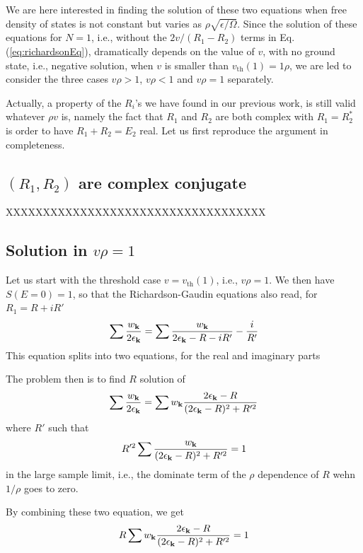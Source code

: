 \documentclass{article}
\begin{document}
We are here interested in finding the solution of these two equations when free density of states is not constant but varies as $\rho\sqrt{\epsilon/\Omega}$.  Since the solution of these equations for $N=1$, i.e., without the $2v/(R_1-R_2)$ terms in Eq. (\ref{eq:richardsonEq}), dramatically depends on the value of $v$, with no ground state, i.e., negative solution, when $v$ is smaller than $v_{\text{th}}(1)=1\rho$, we are led to consider the three cases $v\rho>1$, $v\rho<1$ and $v\rho=1$ separately. 

Actually, a property of the $R_i$'s we have found in our previous work, is still valid whatever $\rho{}v$ is, namely the fact that $R_1$ and $R_2$ are both complex with $R_1=R_2^*$ is order to have $R_1+R_2=E_2$ real.  Let us first reproduce the argument in completeness. 

\subsection{$(R_1,R_2)$ are complex conjugate}
XXXXXXXXXXXXXXXXXXXXXXXXXXXXXXXXXXX
\subsection{Solution in $v\rho=1$}
Let us start with the threshold case $v=v_{\text{th}}(1)$, i.e., $v\rho=1$.  We then have $S(E=0)=1$, so that the Richardson-Gaudin equations also read, for $R_1=R+iR'$
\begin{equation}
\sum\frac{w_{\mathbf{k}}}{2\epsilon_{\mathbf{k}}}=\sum\frac{w_{\mathbf{k}}}{2\epsilon_{\mathbf{k}}-R-iR'}-\frac{i}{R'}
\label{eq:}
\end{equation}
This equation splits into two equations, for the real and imaginary parts

The problem then is to find $R$ solution of 
\begin{equation}
\sum\frac{w_{\mathbf{k}}}{2\epsilon_{\mathbf{k}}}=\sum{}w_{\mathbf{k}}\frac{2\epsilon_{\mathbf{k}}-R}{(2\epsilon_{\mathbf{k}}-R)^2+R'^2}
\label{eq:}
\end{equation}
where $R'$ such that 
\begin{equation}
R'^2\sum{}\frac{w_{\mathbf{k}}}{(2\epsilon_{\mathbf{k}}-R)^2+R'^2}=1
\label{eq:R'}
\end{equation}
in the large sample limit, i.e., the dominate term of the $\rho$ dependence of $R$ wehn $1/\rho$ goes to zero. 

By combining these two equation, we get
\begin{equation}
R\sum{}w_{\mathbf{k}}\frac{2\epsilon_{\mathbf{k}}-R}{(2\epsilon_{\mathbf{k}}-R)^2+R'^2}=1
\label{eq:R}
\end{equation}
\end{document}
